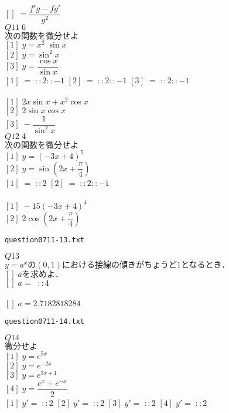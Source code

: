 \documentclass[10pt,dvipdfmx]{jarticle}
\begin{document}
$[]\;=\dfrac{f'g-fg'}{g^2}$\\
$Q11\;6$\\
$\text{次の関数を微分せよ}$\\
$[1]\;y=x^2\;\sin x $\\
$[2]\;y=\sin^{2}\! x $\\
$[3]\;y=\dfrac{\cos x }{\sin x }$\\
$[1]\;=\;::2::-1$ 
$[2]\;=\;::2::-1$ 
$[3]\;=\;::2::-1$ 
\\
\\
$[1]\;2x\sin x +x^2\cos x $\\
$[2]\;2\sin x \cos x $\\
$[3]\;-\dfrac{1}{\sin^{2}\! x }$\\
$Q12\;4$\\
$\text{次の関数を微分せよ}$\\
$[1]\;y=(-3x+4)^5$\\
$[2]\;y=\sin (2x+\dfrac{{\pi}}{4}) $\\
$[1]\;=\;::2$ 
$[2]\;=\;::2::-1$ 
\\
\\
$[1]\;-15(-3x+4)^4$\\
$[2]\;2\cos (2x+\dfrac{{\pi}}{4}) $\\
\newpage
\begin{center}
\verb|question0711-13.txt|\\
\end{center}
$Q13$\\
$y=a^x\text{の}(0,1)\text{における接線の傾きがちょうど}1\text{となるとき．}$\\
$[]\;a\text{を求めよ．}$\\
$[]\;a=\;\;::4$ 
\\
\\
$[]\;a=2.7182818284$\\
\newpage
\begin{center}
\verb|question0711-14.txt|\\
\end{center}
$Q14$\\
$\text{微分せよ}$\\
$[1]\;y=e^{5x}$\\
$[2]\;y=e^{-2x}$\\
$[3]\;y=e^{3x+1}$\\
$[4]\;y=\dfrac{e^x+e^{-x}}{2}$\\
$[1]\;y'=\;::2$ 
$[2]\;y'=\;::2$ 
$[3]\;y'=\;::2$ 
$[4]\;y'=\;::2$ 
\\
\\
\end{document}
